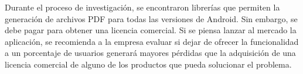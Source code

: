 Durante el proceso de investigación, se encontraron librerías que permiten la generación de archivos PDF para todas las versiones de Android. Sin embargo, se debe pagar para obtener una licencia comercial. Si se piensa lanzar al mercado la aplicación, se recomienda a la empresa evaluar si dejar de ofrecer la funcionalidad a un porcentaje de usuarios generará mayores pérdidas que la adquisición de una licencia comercial de alguno de los productos que pueda solucionar el problema.

